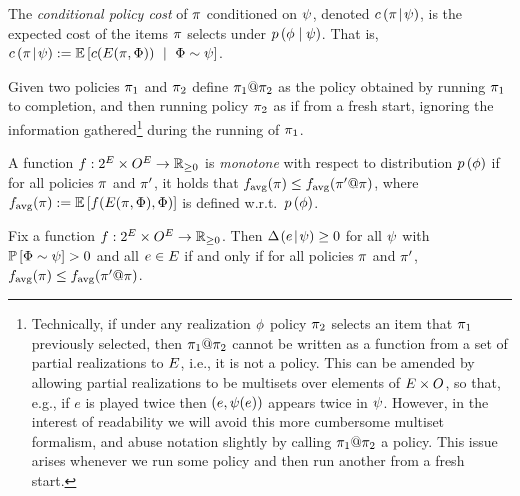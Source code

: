 \begin{definition}
%
%
The \emph{conditional policy cost} of $\pi$ conditioned on
${\color{black}{\ensuremath{\psi}}}$, denoted $c \left( { {\pi} \! \mid \! {{\color{black}{\ensuremath{\psi}}}} } \right)  $, is the expected cost of
the items $\pi$ selects under ${\color{black}{\ensuremath{p \left( {{\color{black}{\ensuremath{\phi}}} \mid {\color{black}{\ensuremath{\psi}}}} \right) }}}$.  That is, 
$c \left( { {\pi} \! \mid \! {{\color{black}{\ensuremath{\psi}}}} } \right)   := \mathbb{E}\left[c(E({\pi}, {{\color{black}{\ensuremath{\Phi}}}}))  \ \mid \ {\color{black}{\ensuremath{\Phi}}} \sim
  {\color{black}{\ensuremath{\psi}}}\right]$.
%
\end{definition}



\begin{definition} \label{def:policy-concatenation}
Given two policies $\pi_1$ and $\pi_2$ 
%
define ${\pi_1}@{\pi_2}$ as the policy obtained by running $\pi_1$ to completion, and then running policy  $\pi_2$ as if from a fresh start, ignoring the information
 gathered\footnote{Technically, if under any realization ${\color{black}{\ensuremath{\phi}}}$ policy
   $\pi_2$ selects an item that
   $\pi_1$ previously selected, then ${\pi_1}@{\pi_2}$
   cannot be written as a function from a set of partial realizations
   to $E$, i.e., it is not a policy.  This can be amended by
   allowing partial realizations to be multisets over elements of
   $E \times O$, so that, e.g., if $e$ is played
   twice
   then $(e, {\color{black}{\ensuremath{\psi}}}(e))$ appears twice in
   ${\color{black}{\ensuremath{\psi}}}$.  However, in the interest of readability we will avoid this more cumbersome multiset
   formalism, and abuse notation slightly by calling
   ${\pi_1}@{\pi_2}$ a policy.  This issue arises
   whenever we run some policy and then run another from a fresh start.}
 during the running of $\pi_1$.
\end{definition}

\begin{definition} \label{def:monotonicity-append}
A function $f:2^{E} \times O^{E} \to \mathbb{R}_{\ge 0}$
is \emph{\term monotone} with respect to distribution ${\color{black}{\ensuremath{p \left( {{\color{black}{\ensuremath{\phi}}}} \right) }}}$ 
if for all policies $\pi$ and $\pi'$, 
 it holds that 
$f_{\text{avg}}(\pi)\leq f_{\text{avg}}( {\pi'}@{\pi})$, where 
$f_{\text{avg}}(\pi) := \mathbb{E}\left[f(E({\pi}, {{\color{black}{\ensuremath{\Phi}}}}), {\color{black}{\ensuremath{\Phi}}})\right]$
is defined w.r.t.~${\color{black}{\ensuremath{p \left( {{\color{black}{\ensuremath{\phi}}}} \right) }}}$. 
\end{definition}


\begin{lemma} \label{lem:monotonicity-equivalence}
Fix a function $f:2^{E} \times O^{E} \to \mathbb{R}_{\ge 0}$.
Then $\Delta \hspace{-0.3mm} \left( { {e}\! \mid \! {{\color{black}{\ensuremath{\psi}}}} } \right)   \ge 0$ for all ${\color{black}{\ensuremath{\psi}}}$ with $\mathbb{P}\left[{\color{black}{\ensuremath{\Phi}}} \sim {\color{black}{\ensuremath{\psi}}}\right]  > 0$ and all $e \in E$
if and only if
for all policies $\pi$ and $\pi'$, 
$f_{\text{avg}}(\pi)\leq f_{\text{avg}}( {\pi'}@{\pi})$. 
\end{lemma}

